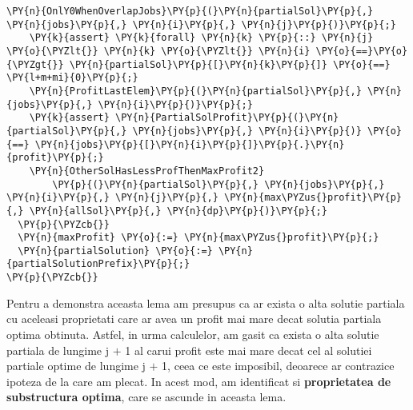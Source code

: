 \begin{Verbatim}[commandchars=\\\{\}, fontsize=\small]
    \PY{n}{OnlY0WhenOverlapJobs}\PY{p}{(}\PY{n}{partialSol}\PY{p}{,} \PY{n}{jobs}\PY{p}{,} \PY{n}{i}\PY{p}{,} \PY{n}{j}\PY{p}{)}\PY{p}{;} 
    \PY{k}{assert} \PY{k}{forall} \PY{n}{k} \PY{p}{::} \PY{n}{j} \PY{o}{\PYZlt{}} \PY{n}{k} \PY{o}{\PYZlt{}} \PY{n}{i} \PY{o}{==}\PY{o}{\PYZgt{}} \PY{n}{partialSol}\PY{p}{[}\PY{n}{k}\PY{p}{]} \PY{o}{==} \PY{l+m+mi}{0}\PY{p}{;}
    \PY{n}{ProfitLastElem}\PY{p}{(}\PY{n}{partialSol}\PY{p}{,} \PY{n}{jobs}\PY{p}{,} \PY{n}{i}\PY{p}{)}\PY{p}{;}
    \PY{k}{assert} \PY{n}{PartialSolProfit}\PY{p}{(}\PY{n}{partialSol}\PY{p}{,} \PY{n}{jobs}\PY{p}{,} \PY{n}{i}\PY{p}{)} \PY{o}{==} \PY{n}{jobs}\PY{p}{[}\PY{n}{i}\PY{p}{]}\PY{p}{.}\PY{n}{profit}\PY{p}{;}
    \PY{n}{OtherSolHasLessProfThenMaxProfit2}
        \PY{p}{(}\PY{n}{partialSol}\PY{p}{,} \PY{n}{jobs}\PY{p}{,} \PY{n}{i}\PY{p}{,} \PY{n}{j}\PY{p}{,} \PY{n}{max\PYZus{}profit}\PY{p}{,} \PY{n}{allSol}\PY{p}{,} \PY{n}{dp}\PY{p}{)}\PY{p}{;}
  \PY{p}{\PYZcb{}}
  \PY{n}{maxProfit} \PY{o}{:=} \PY{n}{max\PYZus{}profit}\PY{p}{;}
  \PY{n}{partialSolution} \PY{o}{:=} \PY{n}{partialSolutionPrefix}\PY{p}{;}
\PY{p}{\PYZcb{}}
\end{Verbatim}


Pentru a demonstra aceasta lema am presupus ca ar exista o alta solutie partiala cu aceleasi proprietati care ar avea un profit mai mare decat solutia partiala optima obtinuta. Astfel, in urma calculelor, am gasit ca exista o alta solutie partiala de lungime j $+$ 1 al carui profit este mai mare decat cel al solutiei partiale optime de lungime j $+$ 1, ceea ce este imposibil, deoarece ar contrazice ipoteza de la care am plecat. In acest mod, am identificat si \textbf{proprietatea de substructura optima}, care se ascunde in aceasta lema. 


